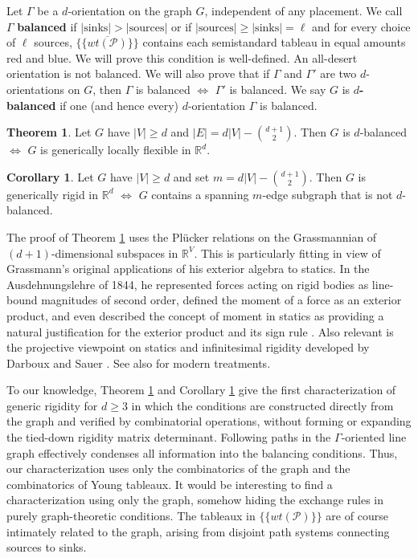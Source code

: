 \documentclass[11pt,letterpaper]{amsart}
\theoremstyle{definition}
\newtheorem{theorem}{Theorem}
\newtheorem{corollary}{Corollary}
\begin{document}
Let $\Gamma$ be a $d$-orientation on the graph $G$, independent of any placement. We call $\Gamma$ \textbf{balanced} if $|\text{sinks}|>|\text{sources}|$ or if $|\text{sources}| \geq |\text{sinks}|=\ell$ and for every choice of $\ell$ sources, $\overline{\{\{ wt(\mathcal{P}) \}\}}$ contains each semistandard tableau in equal amounts red and blue. We will prove this condition is well-defined. An all-desert orientation is not balanced. We will also prove that if $\Gamma$ and $\Gamma'$ are two $d$-orientations on $G$, then $\Gamma$ is balanced $\iff$ $\Gamma'$ is balanced. We say $G$ is \textbf{$d$-balanced} if one (and hence every) $d$-orientation $\Gamma$ is balanced.

\begin{theorem}\label{thm:main-Maxwell-locally-flexible}
    Let $G$ have $|V|\geq d$ and $|E| = d|V| - \binom{d+1}{2}$. Then $G$ is $d$-balanced $\iff$ $G$ is generically locally flexible in $\mathbb{R}^d$.
\end{theorem}

\begin{corollary}\label{cor:characterization}
    Let $G$ have $|V| \geq d$ and set $m = d|V| - \binom{d+1}{2}$. Then $G$ is generically rigid in $\mathbb{R}^d$ $\iff$ $G$ contains a spanning $m$-edge subgraph that is not $d$-balanced.
\end{corollary}


The proof of Theorem \ref{thm:main-Maxwell-locally-flexible} uses the Pl\"ucker relations on the Grassmannian of $(d+1)$-dimensional subspaces in $\mathbb{R}^V$. This is particularly fitting in view of Grassmann's original applications of his exterior algebra to statics.
In the Ausdehnungslehre of 1844, he represented forces acting on rigid bodies as line-bound magnitudes of second order, defined the moment of a force as an exterior product, and even described the concept of moment in statics as providing a natural justification for the exterior product and its sign rule \cite{Grassmann1844}.
Also relevant is the projective viewpoint on statics and infinitesimal rigidity developed by Darboux and Sauer \cite{Darboux1993,Sauer1935}. See also \cite{Izmestiev-projective, Izmestiev2019, NixonSchulzeWhiteley2021} for modern treatments.

To our knowledge, Theorem \ref{thm:main-Maxwell-locally-flexible} and Corollary \ref{cor:characterization} give the first characterization of generic rigidity for $d\geq 3$ in which the conditions are constructed directly from the graph and verified by combinatorial operations, without forming or expanding the tied-down rigidity matrix determinant.
Following paths in the $\Gamma$-oriented line graph effectively condenses all information into the balancing conditions. Thus, our characterization uses only the combinatorics of the graph and the combinatorics of Young tableaux. It would be interesting to find a characterization using only the graph, somehow hiding the exchange rules in purely graph-theoretic conditions. The tableaux in $\{\{wt(\mathcal P)\}\}$ are of course intimately related to the graph, arising from disjoint path systems connecting sources to sinks.
\end{document}
